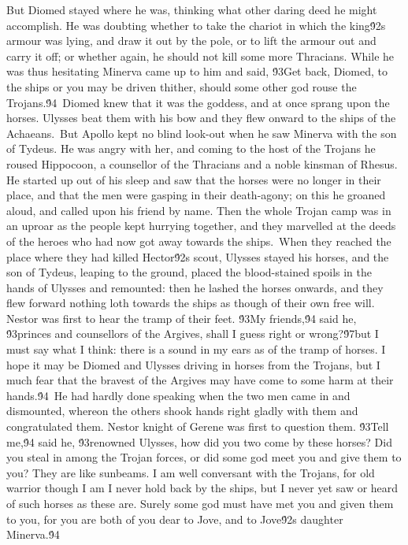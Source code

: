 {But Diomed stayed where he was, thinking what other daring deed he might accomplish. He was doubting whether to take the chariot in which the king\'92s armour was lying, and draw it out by the pole, or to lift the armour out and carry it off; or whether again, he should not kill some more Thracians. While he was thus hesitating Minerva came up to him and said, \'93Get back, Diomed, to the ships or you may be driven thither, should some other god rouse the Trojans.\'94\
Diomed knew that it was the goddess, and at once sprang upon the horses. Ulysses beat them with his bow and they flew onward to the ships of the Achaeans.\
But Apollo kept no blind look-out when he saw Minerva with the son of Tydeus. He was angry with her, and coming to the host of the Trojans he roused Hippocoon, a counsellor of the Thracians and a noble kinsman of Rhesus. He started up out of his sleep and saw that the horses were no longer in their place, and that the men were gasping in their death-agony; on this he groaned aloud, and called upon his friend by name. Then the whole Trojan camp was in an uproar as the people kept hurrying together, and they marvelled at the deeds of the heroes who had now got away towards the ships.\
When they reached the place where they had killed Hector\'92s scout, Ulysses stayed his horses, and the son of Tydeus, leaping to the ground, placed the blood-stained spoils in the hands of Ulysses and remounted: then he lashed the horses onwards, and they flew forward nothing loth towards the ships as though of their own free will. Nestor was first to hear the tramp of their feet. \'93My friends,\'94 said he, \'93princes and counsellors of the Argives, shall I guess right or wrong?\'97but I must say what I think: there is a sound in my ears as of the tramp of horses. I hope it may be Diomed and Ulysses driving in horses from the Trojans, but I much fear that the bravest of the Argives may have come to some harm at their hands.\'94\
He had hardly done speaking when the two men came in and dismounted, whereon the others shook hands right gladly with them and congratulated them. Nestor knight of Gerene was first to question them. \'93Tell me,\'94 said he, \'93renowned Ulysses, how did you two come by these horses? Did you steal in among the Trojan forces, or did some god meet you and give them to you? They are like sunbeams. I am well conversant with the Trojans, for old warrior though I am I never hold back by the ships, but I never yet saw or heard of such horses as these are. Surely some god must have met you and given them to you, for you are both of you dear to Jove, and to Jove\'92s daughter Minerva.\'94\
}
